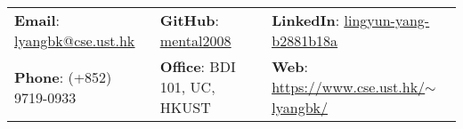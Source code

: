 \documentclass[letterpaper, 11pt]{article}
\begin{document}


\setlength{\tabcolsep}{8pt}


\vspace{0.5cm} 
\begin{center}
\begin{tabular}{lll}
\textbf{Email}: \href{mailto:lyangbk@cse.ust.hk}{\underline{lyangbk@cse.ust.hk}} &
\hspace{0.25in} \textbf{GitHub}: \href{https://github.com/mental2008}{\underline{mental2008}} &
\hspace{0.1in} \textbf{LinkedIn}: \href{https://www.linkedin.com/in/lingyun-yang-b2881b18a/}{\underline{lingyun-yang-b2881b18a}} \\

\textbf{Phone}: (+852) 9719-0933 &
\hspace{0.25in} \textbf{Office}: BDI 101, UC, HKUST &
\hspace{0.1in} \textbf{Web}: \href{https://www.cse.ust.hk/~lyangbk/}{\underline{https://www.cse.ust.hk/$\sim$lyangbk/}} \\
\end{tabular}
\end{center}
\end{document}
